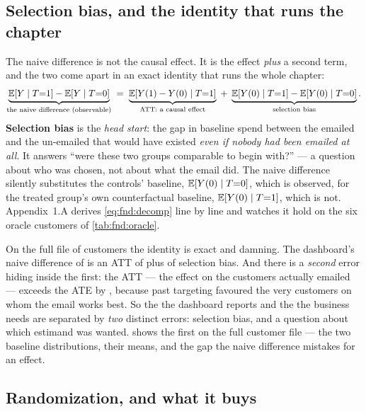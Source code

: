 

\subsection*{Selection bias, and the identity that runs the chapter}

The naive difference is not the causal effect. It is the effect \emph{plus} a second term, and
the two come apart in an exact identity that runs the whole chapter:
%
\begin{equation}
  \underbrace{\operatorname{\mathbb{E}}[Y \mid T{=}1] - \operatorname{\mathbb{E}}[Y \mid T{=}0]}_{\text{the naive difference (observable)}}
  \;=\;
  \underbrace{\operatorname{\mathbb{E}}[Y(1) - Y(0) \mid T{=}1]}_{\text{ATT: a causal effect}}
  \;+\;
  \underbrace{\operatorname{\mathbb{E}}[Y(0) \mid T{=}1] - \operatorname{\mathbb{E}}[Y(0) \mid T{=}0]}_{\text{selection bias}} .
  \label{eq:fnd:decomp}
\end{equation}
%
\textbf{Selection bias} is the \emph{head start}: the gap in baseline spend between the emailed
and the un-emailed that would have existed \emph{even if nobody had been emailed at all}. It
answers ``were these two groups comparable to begin with?'' --- a question about who was chosen,
not about what the email did. The naive difference silently substitutes the controls' baseline,
$\operatorname{\mathbb{E}}[Y(0) \mid T{=}0]$, which is observed, for the treated group's own counterfactual baseline,
$\operatorname{\mathbb{E}}[Y(0) \mid T{=}1]$, which is not. Appendix~1.A derives \cref{eq:fnd:decomp} line by line and
watches it hold on the six oracle customers of \cref{tab:fnd:oracle}.

On the full file of \nbZeroNCustomers{} customers the identity is exact and damning. The
dashboard's naive difference of \eur{\nbZeroNaiveObs} is an ATT of \eur{\nbZeroAtt} plus
\eur{\nbZeroSelBias} of selection bias. And there is a \emph{second} error hiding inside the
first: the ATT --- the effect on the customers actually emailed --- exceeds the ATE by
\eur{\nbZeroTargetingGap}, because past targeting favoured the very customers on whom the email
works best. So the \eur{\nbZeroObsNaive} the dashboard reports and the \eur{\nbZeroTrueAte} the
business needs are separated by \emph{two} distinct errors: selection bias, and a question about
which estimand was wanted.  shows the first on the full customer file --- the
two baseline distributions, their means, and the gap the naive difference mistakes for an effect.



\subsection*{Randomization, and what it buys}

